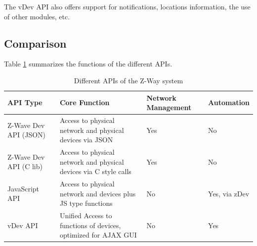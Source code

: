 The vDev API also offers support for notifications, locations information, the use of other modules, etc.

\subsection{Comparison}

Table \ref{c1:comp} summarizes the functions of the different APIs.


\begin{table}
\begin{tabular}{|p{}|p{}|p{}|p{}|}
\hline
API Type &	Core Function & Network Management & Automation\\
\hline
Z-Wave Dev API (JSON)	& Access to physical network and physical devices via JSON	&
Yes	&No\\
\hline
Z-Wave Dev API (C lib) 	& Access to physical network and physical devices via C style calls &
Yes	&No\\
\hline
JavaScript API & Access to physical network and devices plus JS type functions	&
No	&Yes, via zDev\\
\hline
vDev API & Unified Access to functions of devices, optimized for AJAX GUI&
No	&Yes\\
\hline
\hline
\end{tabular}
\caption{Different APIs of the Z-Way system}
\label{c1:comp}
\end{table}		
